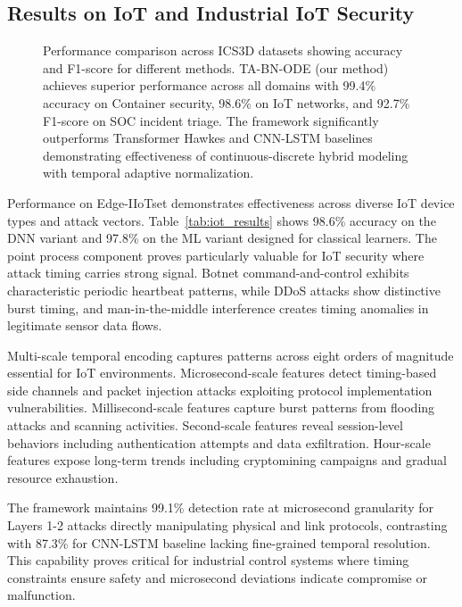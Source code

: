\documentclass[10pt,journal,compsoc]{IEEEtran}
\begin{document}
\subsection{Results on IoT and Industrial IoT Security}

\begin{figure}[!t]
\centering

\caption{Performance comparison across ICS3D datasets showing accuracy and F1-score for different methods. TA-BN-ODE (our method) achieves superior performance across all domains with 99.4\% accuracy on Container security, 98.6\% on IoT networks, and 92.7\% F1-score on SOC incident triage. The framework significantly outperforms Transformer Hawkes and CNN-LSTM baselines demonstrating effectiveness of continuous-discrete hybrid modeling with temporal adaptive normalization.}
\label{fig:performance}
\end{figure}

Performance on Edge-IIoTset demonstrates effectiveness across diverse IoT device types and attack vectors. Table~\ref{tab:iot_results} shows 98.6\% accuracy on the DNN variant and 97.8\% on the ML variant designed for classical learners. The point process component proves particularly valuable for IoT security where attack timing carries strong signal. Botnet command-and-control exhibits characteristic periodic heartbeat patterns, while DDoS attacks show distinctive burst timing, and man-in-the-middle interference creates timing anomalies in legitimate sensor data flows.

Multi-scale temporal encoding captures patterns across eight orders of magnitude essential for IoT environments. Microsecond-scale features detect timing-based side channels and packet injection attacks exploiting protocol implementation vulnerabilities. Millisecond-scale features capture burst patterns from flooding attacks and scanning activities. Second-scale features reveal session-level behaviors including authentication attempts and data exfiltration. Hour-scale features expose long-term trends including cryptomining campaigns and gradual resource exhaustion.

The framework maintains 99.1\% detection rate at microsecond granularity for Layers 1-2 attacks directly manipulating physical and link protocols, contrasting with 87.3\% for CNN-LSTM baseline lacking fine-grained temporal resolution. This capability proves critical for industrial control systems where timing constraints ensure safety and microsecond deviations indicate compromise or malfunction.
\end{document}

